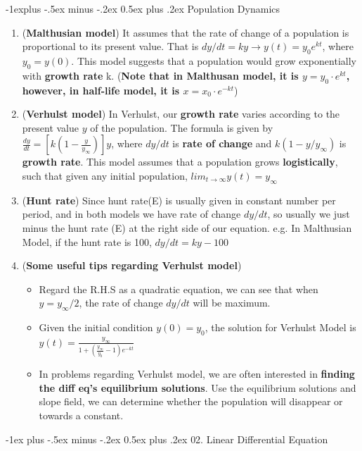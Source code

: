 \documentclass[10pt, landscape]{article}
\makeatletter
\renewcommand{\section}{\@startsection{section}{1}{0mm}%
                                {-1ex plus -.5ex minus -.2ex}%
                                {0.5ex plus .2ex}%
                                {\normalfont\large\bfseries}}
\renewcommand{\subsection}{\@startsection{subsection}{2}{0mm}%
                                {-1explus -.5ex minus -.2ex}%
                                {0.5ex plus .2ex}%
                                {\normalfont\normalsize\bfseries}}
\makeatother
\begin{document}
\begin{multicols}{4}
\subsection{Population Dynamics}
\begin{enumerate}
    \item (\textbf{Malthusian model}) It assumes that the rate of change of a population is proportional to its present value. That is $dy/dt=ky\rightarrow y(t)=y_0e^{kt}$, where $y_0=y(0)$. This model suggests that a population would grow exponentially with \textbf{growth rate} k. (\textbf{Note that in Malthusan model, it is $y=y_0\cdot e^{kt}$, however, in half-life model, it is $x=x_0\cdot e^{-kt}$})
    \item (\textbf{Verhulst model}) In Verhulst, our \textbf{growth rate} varies according to the present value $y$ of the population. The formula is given by $\frac{dy}{dt}=[k(1-\frac{y}{y_\infty})]y$, where $dy/dt$ is \textbf{rate of change} and $k(1-y/y_\infty)$ is \textbf{growth rate}. This model assumes that a population grows \textbf{logistically}, such that given any initial population, $lim_{t\to \infty}y(t)=y_\infty$
    \item (\textbf{Hunt rate}) Since hunt rate(E) is usually given in constant number per period, and in both models we have rate of change $dy/dt$, so usually we just minus the hunt rate (E) at the right side of our equation. e.g. In Malthusian Model, if the hunt rate is 100, $dy/dt=ky-100$
    \item (\textbf{Some useful tips regarding Verhulst model})
    \begin{itemize}
        \item Regard the R.H.S as a quadratic equation, we can see that when $y=y_\infty/2$, the rate of change $dy/dt$ will be maximum.
        \item Given the initial condition $y(0)=y_0$, the solution for Verhulst Model is $y(t)=\frac{y_\infty}{1+(\frac{y_\infty}{y_0}-1)e^{-kt}}$
        \item In problems regarding Verhulst model, we are often interested in \textbf{finding the diff eq's equilibrium solutions}. Use the equilibrium solutions and slope field, we can determine whether the population will disappear or towards a constant.
    \end{itemize}
\end{enumerate}

\section{02. Linear Differential Equation}

\end{multicols}
\end{document}
